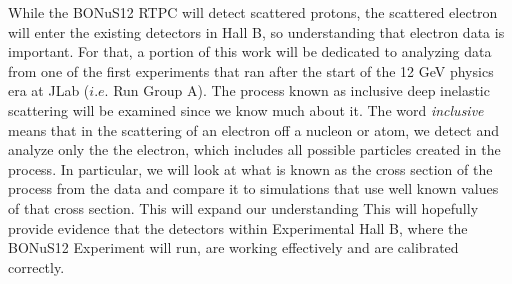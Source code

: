 While the BONuS12 RTPC will detect scattered protons, the scattered electron will enter the existing detectors in Hall B, so understanding that electron data is important. For that, a portion of this work will be dedicated to analyzing data from one of the first experiments that ran after the start of the 12 GeV physics era at JLab ($i.e.$ Run Group A). The process known as inclusive deep inelastic scattering will be examined since we know much about it. The word \textit{inclusive} means that in the scattering of an electron off a nucleon or atom, we detect and analyze only the the electron, which includes all possible particles created in the process. In particular, we will look at what is known as the cross section of the process from the data and compare it to simulations that use well known values of that cross section. This will expand our understanding This will hopefully provide evidence that the detectors within Experimental Hall B, where the BONuS12 Experiment will run, are working effectively and are calibrated correctly.